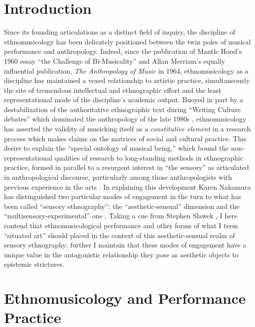 \hypertarget{introduction}{%
\section{Introduction}\label{introduction}}

Since its founding articulations as a distinct field of inquiry, the
discipline of ethnomusicology has been delicately positioned between the
twin poles of musical performance and anthropology. Indeed, since the
publication of Mantle Hood's 1960 essay ``the Challenge of
Bi-Musicality'' and Allan Merriam's equally influential publication,
\emph{The Anthropology of Music} in 1964, ethnomusicology as a
discipline has maintained a vexed relationship to artistic practice,
simultaneously the site of tremendous intellectual and ethnographic
effort and the least representational mode of the discipline's academic
output. Buoyed in part by a destabilization of the authoritative
ethnographic text during ``Writing Culture debates'' which dominated the
anthropology of the late 1980s \autocite[see:][]{zenker_writing_2014},
ethnomusicology has asserted the validity of musicking itself as a
\emph{constitutive element} in a research process which makes claims on
the matrices of social and cultural practice. This desire to explain the
``special ontology of musical being,'' which bound the
non-representational qualities of research to long-standing methods in
ethnographic practice, formed in parallel to a resurgent interest in
``the sensory'' as articulated in anthropological discourse,
particularly among those anthropologists with previous experience in the
arts
\autocites[32]{titon_knowing_2008}{ingold_description_2013}{pink_situating_2012}.
In explaining this development Karen Nakamura has distinguished two
particular modes of engagement in the turn to what has been called
``sensory ethnography'': the ``aesthetic-sensual'' dimension and the
``multisensory-experimental'' one \autocite*[133]{nakamura_making_2013}.
Taking a cue from Stephen Slawek \autocite*{slawek_study_1994}, I here
contend that ethnomusicological performance and other forms of what I
term \autocite[after][]{haraway_situated_1988} ``situated art'' should
placed in the context of this aesthetic-sensual realm of sensory
ethnography; further I maintain that these modes of engagement have a
unique value in the antagonistic relationship they pose as aesthetic
objects to epistemic strictures.

\hypertarget{ethnomusicology-and-performance-practice}{%
\section{Ethnomusicology and Performance
Practice}\label{ethnomusicology-and-performance-practice}}

